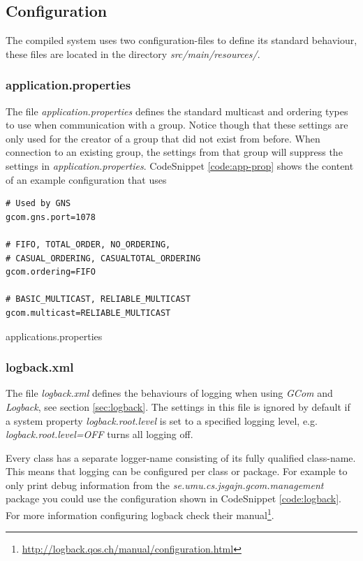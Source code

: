 \documentclass[titlepage, twocolumn, a4paper, 10pt]{article}
\begin{document}
\subsection{Configuration}\label{sec:configuration}
The compiled system uses two configuration-files to define its
standard behaviour, these files are located in the directory
\textit{src/main/resources/}.

\subsubsection{application.properties}\label{sec:application.properties}
The file \textit{application.properties} defines the standard
multicast and ordering types to use when communication with a group.
Notice though that these settings are only used for the creator of a
group that did not exist from before. When connection to an existing
group, the settings from that group will suppress the settings in
\textit{application.properties}. CodeSnippet \ref{code:app-prop}
shows the content of an example configuration that uses

\begin{code}
  \begin{footnotesize}
\begin{verbatim}
# Used by GNS
gcom.gns.port=1078

# FIFO, TOTAL_ORDER, NO_ORDERING,
# CASUAL_ORDERING, CASUALTOTAL_ORDERING
gcom.ordering=FIFO

# BASIC_MULTICAST, RELIABLE_MULTICAST
gcom.multicast=RELIABLE_MULTICAST
\end{verbatim}
  \end{footnotesize}
  \caption{applications.properties}\label{code:app-prop}
\end{code}

\subsubsection{logback.xml}\label{sec:logback.xml}
The file \textit{logback.xml} defines the behaviours of logging when
using \textit{GCom} and \textit{Logback}, see section
\ref{sec:logback}. The settings in this file is ignored by default if
a system property \textit{logback.root.level} is set to a specified
logging level, e.g. \textit{\textit{logback.root.level=OFF}} turns all
logging off.

Every class has a separate logger-name consisting of its fully
qualified class-name. This means that logging can be configured per
class or package. For example to only print debug information from the
\textit{se.umu.cs.jsgajn.gcom.management} package you could use the
configuration shown in CodeSnippet \ref{code:logback}. For more
information configuring logback check their
manual\footnote{\url{http://logback.qos.ch/manual/configuration.html}}.
\end{document}
